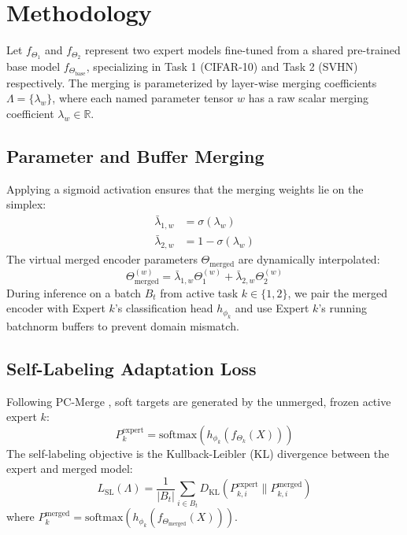 \documentclass{article}
\theoremstyle{plain}
\theoremstyle{definition}
\theoremstyle{remark}
\begin{document}
\section{Methodology}
Let $f_{\Theta_1}$ and $f_{\Theta_2}$ represent two expert models fine-tuned from a shared pre-trained base model $f_{\Theta_{\text{base}}}$, specializing in Task 1 (CIFAR-10) and Task 2 (SVHN) respectively. The merging is parameterized by layer-wise merging coefficients $\Lambda = \{\lambda_w\}$, where each named parameter tensor $w$ has a raw scalar merging coefficient $\lambda_w \in \mathbb{R}$.

\subsection{Parameter and Buffer Merging}
Applying a sigmoid activation ensures that the merging weights lie on the simplex:
\begin{align}
    \bar{\lambda}_{1, w} &= \sigma(\lambda_w) \\
    \bar{\lambda}_{2, w} &= 1 - \sigma(\lambda_w)
\end{align}
The virtual merged encoder parameters $\Theta_{\text{merged}}$ are dynamically interpolated:
\begin{equation}
    \Theta_{\text{merged}}^{(w)} = \bar{\lambda}_{1, w} \Theta_1^{(w)} + \bar{\lambda}_{2, w} \Theta_2^{(w)}
\end{equation}
During inference on a batch $B_t$ from active task $k \in \{1, 2\}$, we pair the merged encoder with Expert $k$'s classification head $h_{\phi_k}$ and use Expert $k$'s running batchnorm buffers to prevent domain mismatch.

\subsection{Self-Labeling Adaptation Loss}
Following PC-Merge \cite{pc_merge}, soft targets are generated by the unmerged, frozen active expert $k$:
\begin{equation}
    P^{\text{expert}}_k = \text{softmax}(h_{\phi_k}(f_{\Theta_k}(X)))
\end{equation}
The self-labeling objective is the Kullback-Leibler (KL) divergence between the expert and merged model:
\begin{equation}
    L_{\text{SL}}(\Lambda) = \frac{1}{|B_t|} \sum_{i \in B_t} D_{\text{KL}}(P^{\text{expert}}_{k, i} \parallel P^{\text{merged}}_{k, i})
\end{equation}
where $P^{\text{merged}}_k = \text{softmax}(h_{\phi_k}(f_{\Theta_{\text{merged}}}(X)))$.
\end{document}
